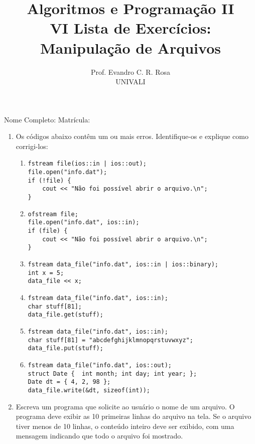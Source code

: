 \documentclass[12pt]{article}
\title{Algoritmos e Programação II\\
\large VI Lista de Exercícios: Manipulação de Arquivos}
\author{Prof. Evandro C. R. Rosa\\UNIVALI}
\date{}
\begin{document}
\maketitle

\noindent Nome Completo: \underline{\hspace{8cm}} Matrícula: \underline{\hspace{2.4cm}}

\begin{enumerate}
  \item Os códigos abaixo contêm um ou mais erros. Identifique-os e explique como corrigi-los:
    \begin{enumerate}
      \item
        \begin{verbatim}
fstream file(ios::in | ios::out);
file.open("info.dat");
if (!file) {
    cout << "Não foi possível abrir o arquivo.\n";
}
        \end{verbatim}
      \item
        \begin{verbatim}
ofstream file;
file.open("info.dat", ios::in);
if (file) {
    cout << "Não foi possível abrir o arquivo.\n";
}
        \end{verbatim}
      \item
        \begin{verbatim}
fstream data_file("info.dat", ios::in | ios::binary);
int x = 5;
data_file << x;
        \end{verbatim}
      \item
        \begin{verbatim}
fstream data_file("info.dat", ios::in);
char stuff[81];
data_file.get(stuff);
        \end{verbatim}
      \item
        \begin{verbatim}
fstream data_file("info.dat", ios::in);
char stuff[81] = "abcdefghijklmnopqrstuvwxyz";
data_file.put(stuff);
        \end{verbatim}
      \item
        \begin{verbatim}
fstream data_file("info.dat", ios::out);
struct Date {  int month; int day; int year; };
Date dt = { 4, 2, 98 };
data_file.write(&dt, sizeof(int));
        \end{verbatim}
    \end{enumerate}

  \item Escreva um programa que solicite ao usuário o nome de um arquivo. O programa deve exibir as 10 primeiras linhas do arquivo na tela. Se o arquivo tiver menos de 10 linhas, o conteúdo inteiro deve ser exibido, com uma mensagem indicando que todo o arquivo foi mostrado.


\end{enumerate}
\end{document}
